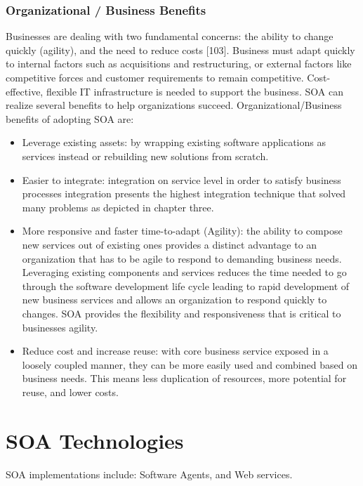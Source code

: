 \documentclass[12pt,a4paper,final,twoside,onecolumn,titlepage]{book}
\begin{document}
\subsubsection{Organizational / Business Benefits}
Businesses are dealing with two fundamental concerns: the ability to change quickly (agility), and the need to reduce costs [103]. Business must adapt quickly to internal factors such as acquisitions and restructuring, or external factors like competitive forces and customer requirements to remain competitive. Cost-effective, flexible IT infrastructure is needed to support the business. \gls{SOA} can realize several benefits to help organizations succeed. Organizational/Business benefits of adopting \gls{SOA} are:
\begin{itemize}
\item Leverage existing assets: by wrapping existing software applications as services instead or rebuilding new solutions from scratch.
\item Easier to integrate: integration on service level in order to satisfy business processes integration presents the highest integration technique that solved many problems as depicted in chapter three.
\item More responsive and faster time-to-adapt (Agility): the ability to compose new services out of existing ones provides a distinct advantage to an organization that has to be agile to respond to demanding business needs. Leveraging existing components and services reduces the time needed to go through the software development life cycle leading to rapid development of new business services and allows an organization to respond quickly to changes. \gls{SOA} provides the flexibility and responsiveness that is critical to businesses agility.
\item Reduce cost and increase reuse: with core business service exposed in a loosely coupled manner, they can be more easily used and combined based on business needs. This means less duplication of resources, more potential for reuse, and lower costs.
\end{itemize}
\section{SOA Technologies}
\gls{SOA} implementations include: Software Agents, and Web services.
\end{document}
